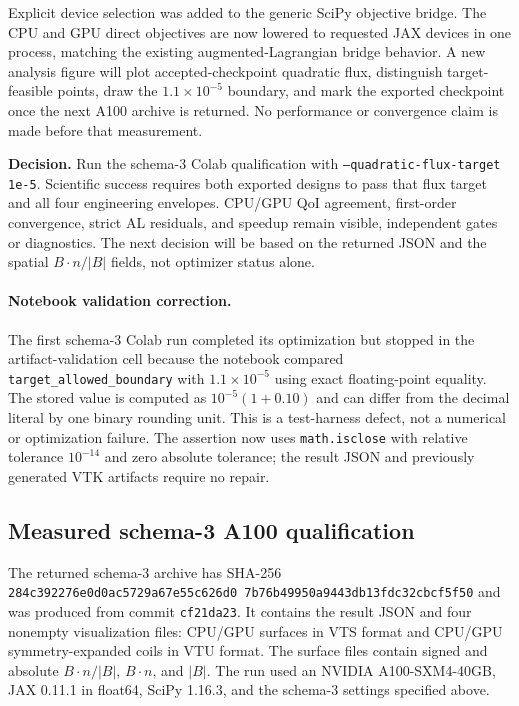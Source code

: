 \documentclass[11pt,a4paper]{article}
\newcommand{\code}[1]{\texttt{#1}}
\begin{document}
Explicit device selection was added to the generic SciPy objective bridge.
The CPU and GPU direct objectives are now lowered to requested JAX devices in
one process, matching the existing augmented-Lagrangian bridge behavior.  A
new analysis figure will plot accepted-checkpoint quadratic flux, distinguish
target-feasible points, draw the $1.1\times10^{-5}$ boundary, and mark the
exported checkpoint once the next A100 archive is returned.  No performance or
convergence claim is made before that measurement.

\textbf{Decision.}  Run the schema-3 Colab qualification with
\code{--quadratic-flux-target 1e-5}.  Scientific success requires both exported
designs to pass that flux target and all four engineering envelopes.  CPU/GPU
QoI agreement, first-order convergence, strict AL residuals, and speedup remain
visible, independent gates or diagnostics.  The next decision will be based on
the returned JSON and the spatial $B\cdot n/|B|$ fields, not optimizer status
alone.

\paragraph{Notebook validation correction.}
The first schema-3 Colab run completed its optimization but stopped in the
artifact-validation cell because the notebook compared
\code{target\_allowed\_boundary} with $1.1\times10^{-5}$ using exact
floating-point equality.  The stored value is computed as
$10^{-5}(1+0.10)$ and can differ from the decimal literal by one binary
rounding unit.  This is a test-harness defect, not a numerical or optimization
failure.  The assertion now uses \code{math.isclose} with relative tolerance
$10^{-14}$ and zero absolute tolerance; the result JSON and previously
generated VTK artifacts require no repair.

\subsection{Measured schema-3 A100 qualification}

The returned schema-3 archive has SHA-256
\code{284c392276e0d0ac\allowbreak{}5729a67e55c626d0\allowbreak{}%
7b76b49950a9443d\allowbreak{}b13fdc32cbcf5f50}
and was produced from commit \code{cf21da23}.  It contains the result JSON and
four nonempty visualization files: CPU/GPU surfaces in VTS format and
CPU/GPU symmetry-expanded coils in VTU format.  The surface files contain
signed and absolute $B\cdot n/|B|$, $B\cdot n$, and $|B|$.  The run used an
NVIDIA A100-SXM4-40GB, JAX 0.11.1 in float64, SciPy 1.16.3, and the schema-3
settings specified above.
\end{document}
